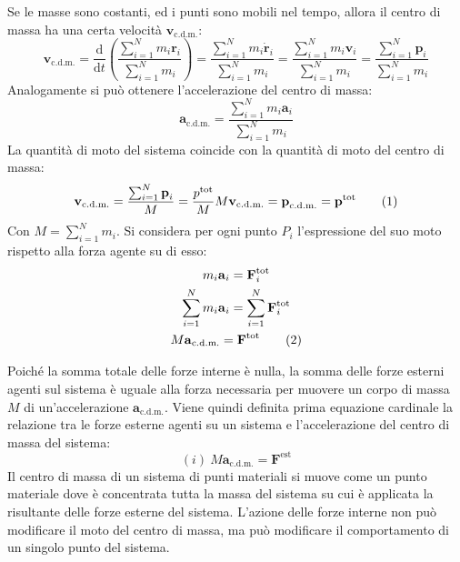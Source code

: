 \documentclass{article}
\newcommand{\vect}[1]{\boldsymbol{\mathbf{#1}}}
\newcommand{\df}{\mathrm{d}}
\numberwithin{equation}{subsection}
\begin{document}
Se le masse sono costanti, ed i punti sono mobili nel tempo, 
allora il centro di massa ha una certa velocità $\vect{v}_{\mathrm{c.d.m.}}$:
\begin{equation}
    \vect{v}_{\mathrm{c.d.m.}}=\frac{\df}{\df t}\left(\displaystyle\frac{\sum_{i=1}^{N}m_i\vect{r}_i}{\sum_{i=1}^{N}m_i}\right)=\displaystyle\frac{\sum_{i=1}^{N}m_i\dot{\vect{r}}_i}{\sum_{i=1}^{N}m_i}=\displaystyle\frac{\sum_{i=1}^{N}m_i\vect{v}_i}{\sum_{i=1}^{N}m_i}=\displaystyle\frac{\sum_{i=1}^{N}\vect{p}_i}{\sum_{i=1}^{N}m_i}
\end{equation}
Analogamente si può ottenere l'accelerazione del centro di 
massa:
\begin{equation}
    \vect{a}_{\mathrm{c.d.m.}}=\displaystyle\frac{\sum_{i=1}^{N}m_i\vect{a}_i}{\sum_{i=1}^{N}m_i}
\end{equation}
La quantità di moto del sistema coincide con la quantità di 
moto del centro di massa: 
\begin{equation*}
    \vect{v}_{\mathrm{c.d.m.}}=\displaystyle\frac{\sum_{i=1}^{N}\vect{p}_i}{M}=\displaystyle\frac{p^\mathrm{tot}}{M}\\
    M\vect{v}_{\mathrm{c.d.m.}}=\vect{p}_{\mathrm{c.d.m.}}=\vect{p}^\mathrm{tot}\tag{\stepcounter{equation}\theequation}
\end{equation*}
Con $M=\sum_{i=1}^{N}m_i$. 
Si considera per ogni punto $P_i$ l'espressione del suo moto rispetto alla forza agente su di esso: 
\begin{gather*}
    m_i\vect{a}_i=\vect{F}_i^\mathrm{tot}\\
    \displaystyle\sum_{i=1}^{N}m_i\vect{a}_i=\sum_{i=1}^{N}\vect{F}_i^\mathrm{tot}\\
    M\vect{a}_{\mathrm{c.d.m.}}=\vect{F}^\mathrm{tot}\tag{\stepcounter{equation}\theequation}
\end{gather*}

Poiché la somma totale delle forze interne è nulla, la somma 
delle forze esterni agenti sul 
sistema è uguale alla forza necessaria per muovere un corpo 
di massa $M$ di un'accelerazione $\vect{a}_{\mathrm{c.d.m.}}$.
Viene quindi definita prima equazione cardinale la relazione tra le forze esterne agenti su un sistema e l'accelerazione del centro di massa del sistema: 
\begin{equation*}
    (i)\:M\vect{a}_{\mathrm{c.d.m.}}=\vect{F}^\mathrm{est}
\end{equation*}
Il centro di massa di un sistema di punti materiali si muove come un punto materiale dove è concentrata tutta la massa del sistema su cui è applicata la risultante delle forze 
esterne del sistema. L'azione delle forze interne non può modificare il moto del centro di massa, ma può modificare il comportamento di un singolo punto del sistema. 
\end{document}
